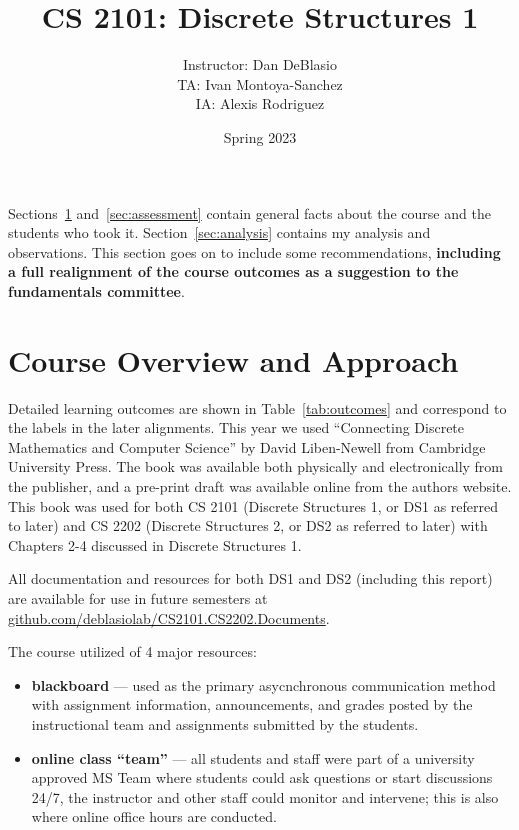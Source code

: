 \documentclass[11pt]{article}
\begin{document}
\title{CS 2101: Discrete Structures 1}
\author{Instructor: Dan DeBlasio\\TA: Ivan Montoya-Sanchez\\IA: Alexis Rodriguez}
\date{Spring 2023}
\maketitle

Sections~\ref{sec:overview} and~\ref{sec:assessment} contain general facts about the course and the students who took it. 
Section~\ref{sec:analysis} contains my analysis and observations. This section goes on to include some recommendations, 
\textbf{\color{red}including a full realignment of the course outcomes as a suggestion to the fundamentals committee}. 

\section{Course Overview and Approach}
\label{sec:overview}
Detailed learning outcomes are shown in Table~\ref{tab:outcomes} and correspond to the labels in the later alignments. 
This year we used ``Connecting Discrete Mathematics and Computer Science'' by David Liben-Newell from Cambridge University Press.
The book was available both physically and electronically from the publisher, and a pre-print draft was available online from the authors website. 
This book was used for both CS 2101 (Discrete Structures 1, or DS1 as referred to later) and CS 2202  (Discrete Structures 2, or DS2 as referred to later) with Chapters 2-4 discussed in Discrete Structures 1. 

All documentation and resources for both DS1 and DS2 (including this report) are available for use in future semesters at \href{https://github.com/deblasiolab/CS2101.CS2202.Documents}{github.com/deblasiolab/CS2101.CS2202.Documents}.

The course utilized of 4 major resources:
\begin{itemize}

\item \textbf{blackboard} --- used as the primary asycnchronous communication method with assignment information, announcements, and grades posted by the instructional team and assignments submitted by the students. 
\item \textbf{online class ``team''} --- all students and staff were part of a university approved MS Team where students could ask questions or start discussions 24/7, 
the instructor and other staff could monitor and intervene; this is also where online office hours are conducted. 
\end{itemize}
\end{document}
